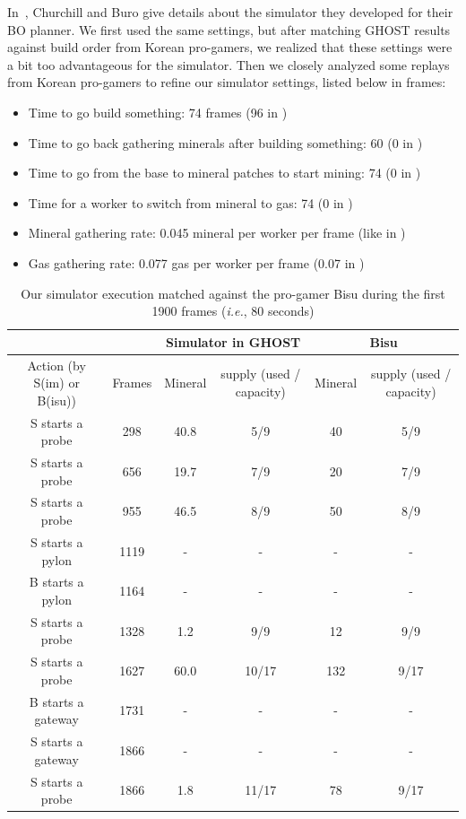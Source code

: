 \documentclass[journal]{IEEEtran}
\newcommand{\ghost}{\textsc{GHOST}\xspace}
\newcommand{\ie}{\textit{i.e.}}
\begin{document}
In~\cite{ChurchillB11},  Churchill and  Buro  give  details about  the
simulator they developed for their BO planner.  We first used
the same  settings, but  after matching  \ghost results  against build
order from Korean pro-gamers, we realized that these settings were a bit too
advantageous for the simulator.  Then we closely analyzed some replays
from Korean pro-gamers to refine  our simulator settings, listed below in frames:
\begin{itemize}
\item Time to go build something: 74 frames (96 in \cite{ChurchillB11})
\item Time to go back  gathering minerals after building something: 60
  (0 in \cite{ChurchillB11})
\item Time to go from the base  to mineral patches to start mining: 74
  (0 in \cite{ChurchillB11})
\item  Time for  a worker  to  switch from  mineral  to gas:  74 (0  in
  \cite{ChurchillB11})
\item Mineral gathering  rate: 0.045 mineral per worker per frame (like in
  \cite{ChurchillB11})
\item  Gas  gathering  rate:  0.077  gas per  worker  per  frame  (0.07 in \cite{ChurchillB11})
\end{itemize}
\begin{table}[ht]
  \caption{Our simulator execution matched  against the pro-gamer Bisu
    during the first 1900 frames (\ie, 80 seconds)}
  \label{tab:korean}
  \centering
  \begin{tabular}{|c|c|c|c|c|c|}
    \cline{3-6}
    \multicolumn{2}{c|}{} & \multicolumn{2}{c|}{Simulator in \ghost} & \multicolumn{2}{c|}{Bisu}\\
    \hline
    Action (by S(im) or B(isu)) & Frames & \multicolumn{1}{c|}{Mineral} & \multicolumn{1}{c|}{supply (used / capacity)} & \multicolumn{1}{c|}{Mineral} & \multicolumn{1}{c|}{supply (used / capacity)}\\
    \hline
    S starts a probe & 298 & 40.8 & 5/9 & 40 & 5/9\\
    S starts a probe & 656 & 19.7 & 7/9 & 20 & 7/9\\
    S starts a probe & 955 & 46.5 & 8/9 & 50 & 8/9\\
    S starts a pylon & 1119 & - & - & - & -\\
    B starts a pylon & 1164 & - & - & - & -\\
    S starts a probe & 1328 & 1.2 & 9/9 & 12 & 9/9\\
    S starts a probe & 1627 & 60.0 & 10/17 & 132 & 9/17\\
    B starts a gateway & 1731 & - & - & - & -\\
    S starts a gateway & 1866 & - & - & - & -\\
    S starts a probe & 1866 & 1.8 & 11/17 & 78 & 9/17\\
    \hline
  \end{tabular}
\end{table}
\end{document}

